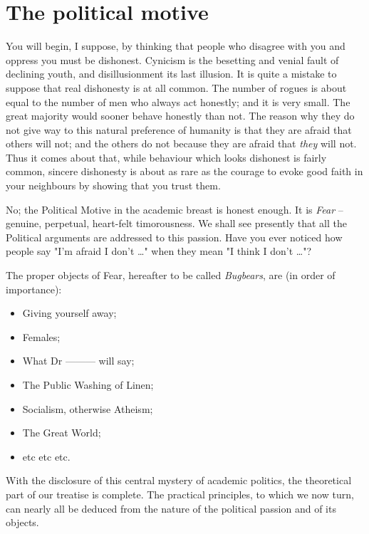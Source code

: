 \documentclass[12pt, oneside, b5paper]{memoir}
\begin{document}
\chapter{The political motive}

You will begin, I suppose, by thinking that people who disagree with you and oppress you must be dishonest. Cynicism is the besetting and venial fault of declining youth, and disillusionment its last illusion. It is quite a mistake to suppose that real dishonesty is at all common. The number of rogues is about equal to the number of men who always act honestly; and it is very small. The great majority would sooner behave honestly than not. The reason why they do not give way to this natural preference of humanity is that they are afraid that others will not; and the others do not because they are afraid that \textit{they} will not. Thus it comes about that, while behaviour which looks dishonest is fairly common, sincere dishonesty is about as rare as the courage to evoke good faith in your neighbours by showing that you trust them.

No; the Political Motive in the academic breast is honest enough. It is \textit{Fear} -- genuine, perpetual, heart-felt timorousness. We shall see presently that all the Political arguments are addressed to this passion. Have you ever noticed how people say "I'm afraid I don't \dots" when they mean "I think I don't \dots"?

The proper objects of Fear, hereafter to be called \emph{Bugbears}, are (in order of importance):

\begin{itemize}
	\item Giving yourself away;
	\item Females;
	\item What Dr --------- will say;
	\item The Public Washing of Linen;
	\item Socialism, otherwise Atheism;
	\item The Great World;
	\item etc etc etc.
\end{itemize}

With the disclosure of this central mystery of academic politics, the theoretical part of our treatise is complete. The practical principles, to which we now turn, can nearly all be deduced from the nature of the political passion and of its objects.
\end{document}
